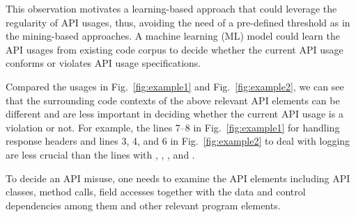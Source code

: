 This observation motivates a learning-based approach that could
leverage the regularity of API usages, thus, avoiding the need of a
pre-defined threshold as in the mining-based approaches. A machine
learning (ML) model could learn the API usages from existing code
corpus to decide whether the current API usage conforms or violates
API usage specifications.

Compared the usages in Fig.~\ref{fig:example1} and
Fig.~\ref{fig:example2}, we can see that the surrounding code contexts
of the above relevant API elements can be different and are less
important in deciding whether the current API usage is a violation or
not. For example, the lines 7--8 in Fig.~\ref{fig:example1} for
handling response headers and lines 3, 4, and 6 in
Fig.~\ref{fig:example2} to deal with logging are less crucial than the
lines with , ,
, and .

\begin{Observation}
To decide an API misuse, one needs to examine the API elements
including API classes, method calls, field accesses together with the
data and control dependencies among them and other relevant program
elements.
\end{Observation}

%
